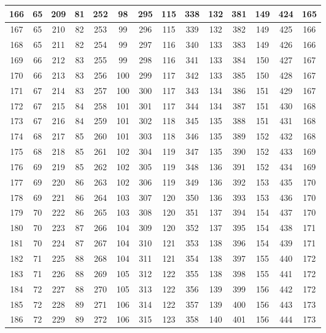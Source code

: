 \documentclass[fin1, tisk]{fmfdelo}
\begin{document}
{\begin{center}
\begin{tabular}{|c|c||c|c||c|c||c|c||c|c||c|c||c|c|}
166 & 65 & 209 & 81 & 252 & 98 & 295 & 115 & 338 & 132 & 381 & 149 & 424 & 165\\ \hline
167 & 65 & 210 & 82 & 253 & 99 & 296 & 115 & 339 & 132 & 382 & 149 & 425 & 166\\ \hline
168 & 65 & 211 & 82 & 254 & 99 & 297 & 116 & 340 & 133 & 383 & 149 & 426 & 166\\ \hline
169 & 66 & 212 & 83 & 255 & 99 & 298 & 116 & 341 & 133 & 384 & 150 & 427 & 167\\ \hline
170 & 66 & 213 & 83 & 256 & 100 & 299 & 117 & 342 & 133 & 385 & 150 & 428 & 167\\ \hline
171 & 67 & 214 & 83 & 257 & 100 & 300 & 117 & 343 & 134 & 386 & 151 & 429 & 167\\ \hline
172 & 67 & 215 & 84 & 258 & 101 & 301 & 117 & 344 & 134 & 387 & 151 & 430 & 168\\ \hline
173 & 67 & 216 & 84 & 259 & 101 & 302 & 118 & 345 & 135 & 388 & 151 & 431 & 168\\ \hline
174 & 68 & 217 & 85 & 260 & 101 & 303 & 118 & 346 & 135 & 389 & 152 & 432 & 168\\ \hline
175 & 68 & 218 & 85 & 261 & 102 & 304 & 119 & 347 & 135 & 390 & 152 & 433 & 169\\ \hline
176 & 69 & 219 & 85 & 262 & 102 & 305 & 119 & 348 & 136 & 391 & 152 & 434 & 169\\ \hline
177 & 69 & 220 & 86 & 263 & 102 & 306 & 119 & 349 & 136 & 392 & 153 & 435 & 170\\ \hline
178 & 69 & 221 & 86 & 264 & 103 & 307 & 120 & 350 & 136 & 393 & 153 & 436 & 170\\ \hline
179 & 70 & 222 & 86 & 265 & 103 & 308 & 120 & 351 & 137 & 394 & 154 & 437 & 170\\ \hline
180 & 70 & 223 & 87 & 266 & 104 & 309 & 120 & 352 & 137 & 395 & 154 & 438 & 171\\ \hline
181 & 70 & 224 & 87 & 267 & 104 & 310 & 121 & 353 & 138 & 396 & 154 & 439 & 171\\ \hline
182 & 71 & 225 & 88 & 268 & 104 & 311 & 121 & 354 & 138 & 397 & 155 & 440 & 172\\ \hline
183 & 71 & 226 & 88 & 269 & 105 & 312 & 122 & 355 & 138 & 398 & 155 & 441 & 172\\ \hline
184 & 72 & 227 & 88 & 270 & 105 & 313 & 122 & 356 & 139 & 399 & 156 & 442 & 172\\ \hline
185 & 72 & 228 & 89 & 271 & 106 & 314 & 122 & 357 & 139 & 400 & 156 & 443 & 173\\ \hline
186 & 72 & 229 & 89 & 272 & 106 & 315 & 123 & 358 & 140 & 401 & 156 & 444 & 173\\ \hline

\end{tabular}
\end{center}}
\end{document}
